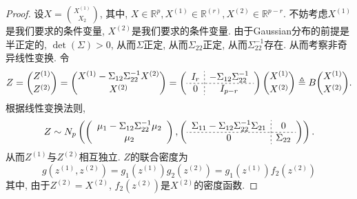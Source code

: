 \documentclass[UTF8, a4paper]{article}
\begin{document}
\begin{proof}
设\(X = \binom{X^{(1)}}{X_2}\), 其中, \(X \in \mathbb{R}^p, X^{(1)} \in \mathbb{R}^{(r)}, X^{(2)} \in \mathbb{R}^{p-r}\).
不妨考虑\(X^{(1)}\)是我们要求的条件变量, \(X^{(2)}\)是我们要求的条件变量. 由于Gaussian分布的前提是半正定的, \(\det(\Sigma) > 0\), 从而\(\Sigma\)正定,  从而\(\Sigma_{22}\)正定, 从而\(\Sigma_{22}^{-1}\)存在. 从而考察非奇异线性变换. 令
$$
Z = \binom{Z^{(1)}}{Z^{(2)}} = \binom{X^{(1)} - \Sigma_{12} \Sigma_{22}^{-1} X^{(2)}}{X^{(2)}} = 
\left(\begin{array}{c;{2pt/2pt}c}
    I_r & -\Sigma_{12}\Sigma_{22}^{-1} \\ \hdashline[2pt/2pt]
    0 & I_{p-r}
\end{array}\right) \binom{X^{(1)}}{X^{(2)}} \triangleq B \binom{X^{(1)}}{X^{(2)}}.
$$
根据线性变换法则, 
$$
Z \sim N_p\left(\left(\begin{array}{c}
    \mu_1 - \Sigma_{12}\Sigma_{22}^{-1}\mu_2 \\
    \mu_2
\end{array}\right), \left(\begin{array}{c;{2pt/2pt}c}
    \Sigma_{11} - \Sigma_{12}\Sigma_{22}^{-1}\Sigma_{21} & 0 \\ \hdashline[2pt/2pt]
    0 & \Sigma_{22}
\end{array}\right)\right).
$$
从而\(Z^{(1)}\)与\(Z^{(2)}\)相互独立. \(Z\)的联合密度为 
$$
g(z^{(1)}, z^{(2)}) = g_1(z^{(1)}) g_2(z^{(2)}) = g_1(z^{(1)}) f_2(z^{(2)})
$$
其中, 由于\(Z^{(2)} = X^{(2)}\), \(f_2(z^{(2)})\)是\(X^{(2)}\)的密度函数. 


\end{proof}
\end{document}
